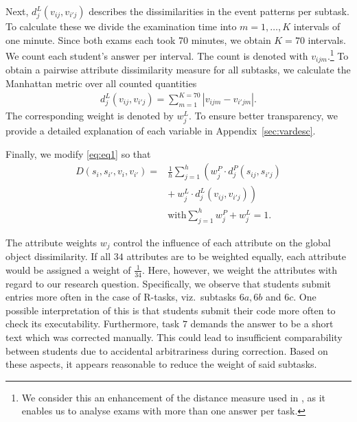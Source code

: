 \documentclass{edm_article}
\begin{document}
Next, $d_j^L(v_{ij}, v_{i'j})$ describes the dissimilarities in the event patterns per subtask. To calculate these we divide the examination time into $m = 1, \ldots, K$ intervals of one minute. Since both exams each took 70 minutes, we obtain $K = 70$ intervals. We count each student's answer per interval. The count is denoted with $v_{ijm}$.\footnote{We consider this an enhancement of the distance measure used in \cite{cleophas2021s}, as it enables us to analyse exams with more than one answer per task.} To obtain a pairwise attribute dissimilarity measure for all subtasks, we calculate the Manhattan metric over all counted quantities
\begin{align}
d_j^L(v_{ij}, v_{i'j}) = \sum^{K = 70}_{m = 1} |v_{ijm} - v_{i'jm}|. \label{eq:eq4} 
\end{align}
The corresponding weight is denoted by $w_j^L$. To ensure better transparency, we provide a detailed explanation of each variable in Appendix~\ref{sec:vardesc}.

Finally, we modify \eqref{eq:eq1} so that
\begin{align}
D(s_i, s_{i'}, v_i, v_{i'}) = & \frac{1}{h} \sum^h_{j = 1} \left( w_j^P \cdot d_j^P(s_{ij}, s_{i'j}) \right.  \nonumber  \\
& \left.  + \ w_j^L \cdot d_j^L(v_{ij}, v_{i'j}) \right) \nonumber \\
& \text{with} \sum^h_{j = 1} w_j^P + w_j^L = 1.
 \label{eq:eq2} 
\end{align}

The attribute weights $w_j$ control the influence of each attribute on the global object dissimilarity. If all $34$ attributes are to be weighted equally, each attribute would be assigned a weight of $\frac{1}{34}$. Here, however, we weight the attributes with regard to our research question. Specifically, we observe that students submit entries more often in the case of R-tasks, viz.~subtasks $6a, 6b$ and $6c$. One possible interpretation of this is that students submit their code more often to check its executability. Furthermore, task $7$ demands the answer to be a short text which was corrected manually. This could lead to insufficient comparability between students due to accidental arbitrariness during correction. Based on these aspects, it appears reasonable to reduce the weight of said subtasks.
\end{document}
